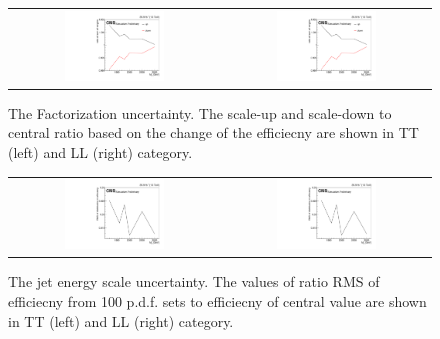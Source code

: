 \begin{itemize}
 \begin{figure}[t]
  \centering
 \begin{tabular}{cc}
    \includegraphics[width=0.5\textwidth]{Figures/scl/scl_TT.pdf} &
   \includegraphics[width=0.5\textwidth]{Figures/scl/scl_TT.pdf} \\
  \end{tabular}
  \caption{The Factorization uncertainty. The scale-up and scale-down to central ratio based on the change of the efficiecny are shown in TT (left) and LL (right) category.}
  \label{fig:hvt_brs}
\end{figure} 

 \begin{figure}[t]
  \centering
 \begin{tabular}{cc}
    \includegraphics[width=0.5\textwidth]{Figures/eff/uncert_pdf_eff_TT.pdf} &
   \includegraphics[width=0.5\textwidth]{Figures/eff/uncert_pdf_eff_TT.pdf} \\
  \end{tabular}
  \caption{The jet energy scale uncertainty. The values of ratio RMS of efficiecny from 100 p.d.f. sets to efficiecny of central value are shown in TT (left) and LL (right) category.}
  \label{fig:hvt_brs}
\end{figure}  


\end{itemize}
